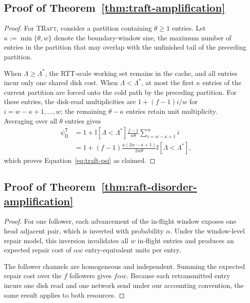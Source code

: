 \subsection{Proof of Theorem~\ref{thm:traft-amplification}}
\begin{proof}
For \textsc{TRaft}, consider a partition containing $\theta\geq1$ entries.
Let
$\kappa:=\min\{\theta,w\}$
denote the boundary-window size, the maximum number of entries in the
partition that may overlap with the unfinished tail of the preceding
partition.

When $\Lambda\geq\Lambda^*$, the RTT-scale working set remains in the cache,
and all entries incur only one shared disk cost.
When $\Lambda<\Lambda^*$, at most the first $\kappa$ entries of the current
partition are forced onto the cold path by the preceding partition.
For these entries, the disk-read multiplicities are
$1+(f-1)i/w$ for
$i=w-\kappa+1,\ldots,w$; the remaining $\theta-\kappa$ entries retain unit
multiplicity.
Averaging over all $\theta$ entries gives
\begin{align*}
\psi_{\mathsf{D}}^{\mathsf{T}}
&=
1+
\mathbb{I}[\Lambda<\Lambda^*]
\frac{f-1}{w\theta}
\sum_{i=w-\kappa+1}^{w}i \\
&=
1+
(f-1)
\frac{\kappa(2w-\kappa+1)}{2w\theta}
\mathbb{I}[\Lambda<\Lambda^*],
\end{align*}
which proves Equation~\ref{eq:traft-psi} as claimed.
\end{proof}

\subsection{Proof of Theorem~\ref{thm:raft-disorder-amplification}}
\begin{proof}
For one follower, each advancement of the in-flight window exposes one head
adjacent pair, which is inverted with probability $\alpha$. Under the
window-level repair model, this inversion invalidates all $w$ in-flight entries
and produces an expected repair cost of $\alpha w$ entry-equivalent
units per entry.

The follower channels are homogeneous and independent. Summing the expected
repair cost over the $f$ followers gives $f\alpha w$. Because each
retransmitted entry incurs one disk read and one network send under our
accounting convention, the same result applies to both resources.
\end{proof}

